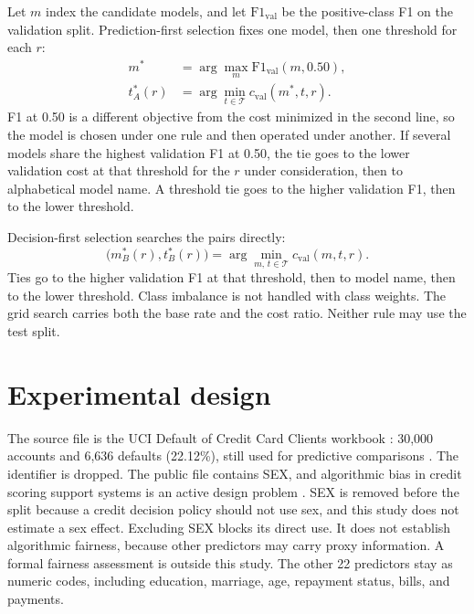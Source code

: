 \documentclass[12pt]{article}
\begin{document}
Let \(m\) index the candidate models, and let \(\mathrm{F1}_{\mathrm{val}}\) be the positive-class F1 on the validation split. Prediction-first selection fixes one model, then one threshold for each \(r\):
\begin{equation}
\begin{aligned}
m^{*}&=\arg\max_{m}\mathrm{F1}_{\mathrm{val}}(m,0.50),\\
t_{A}^{*}(r)&=\arg\min_{t\in\mathcal{T}}c_{\mathrm{val}}(m^{*},t,r).
\end{aligned}
\label{eq:strategy-a}
\end{equation}
F1 at 0.50 is a different objective from the cost minimized in the second line, so the model is chosen under one rule and then operated under another. If several models share the highest validation F1 at 0.50, the tie goes to the lower validation cost at that threshold for the \(r\) under consideration, then to alphabetical model name. A threshold tie goes to the higher validation F1, then to the lower threshold.

Decision-first selection searches the pairs directly:
\begin{equation}
\bigl(m_{B}^{*}(r),t_{B}^{*}(r)\bigr)
=\arg\min_{m,\,t\in\mathcal{T}}c_{\mathrm{val}}(m,t,r).
\label{eq:strategy-b}
\end{equation}
Ties go to the higher validation F1 at that threshold, then to model name, then to the lower threshold. Class imbalance is not handled with class weights. The grid search carries both the base rate and the cost ratio. Neither rule may use the test split.

\section{Experimental design}
The source file is the UCI Default of Credit Card Clients workbook \cite{yeh2009,yehdata}: 30,000 accounts and 6,636 defaults (22.12\%), still used for predictive comparisons \cite{bhandary2025}. The identifier is dropped. The public file contains SEX, and algorithmic bias in credit scoring support systems is an active design problem \cite{lin2026}. SEX is removed before the split because a credit decision policy should not use sex, and this study does not estimate a sex effect. Excluding SEX blocks its direct use. It does not establish algorithmic fairness, because other predictors may carry proxy information. A formal fairness assessment is outside this study. The other 22 predictors stay as numeric codes, including education, marriage, age, repayment status, bills, and payments.
\end{document}
